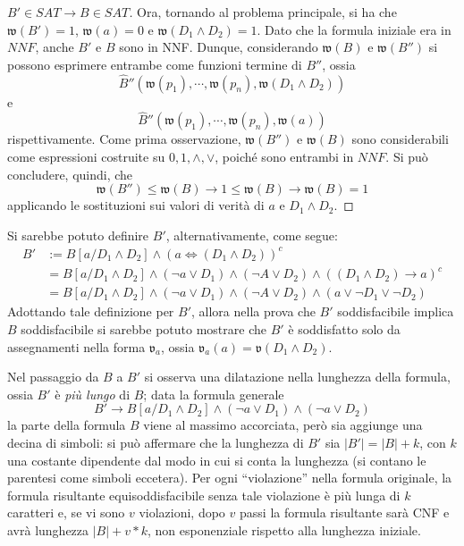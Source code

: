 \begin{proof}[$B' \in SAT \rightarrow B \in SAT$]
        Ora, tornando al problema principale, si ha che  $\mathfrak{w}(B') = 1$, 
        $\mathfrak{w}(a) = 0$ e $\mathfrak{w}(D_1 \land D_2) = 1$. Dato 
        che la formula iniziale era in $NNF$, anche $B'$ e $B$ sono in 
        NNF. Dunque, considerando $\mathfrak{w}(B)$ e $\mathfrak{w}(B'')$ 
        si possono esprimere entrambe come funzioni termine 
        di $B''$, ossia  
        $$
        \hat{B}''(\mathfrak{w}(p_1), \cdots, \mathfrak{w}(p_n), \mathfrak{w}(D_1 \land D_2))
        $$
        e
        $$
        \hat{B}''(\mathfrak{w}(p_1), \cdots, \mathfrak{w}(p_n), \mathfrak{w}(a))
        $$
        rispettivamente. Come prima osservazione, $\mathfrak{w}(B'')$ e $\mathfrak{w}(B)$
        sono considerabili come espressioni costruite su $0,1,\land,\lor$, poiché 
        sono entrambi in $NNF$. Si può concludere, quindi, che 
        $$
        \mathfrak{w}(B'') \leq \mathfrak{w}(B) \rightarrow 1 \leq \mathfrak{w}(B) \rightarrow \mathfrak{w}(B) = 1
        $$
        applicando le sostituzioni sui valori di verità di $a$ e $D_1 \land D_2$. 
\end{proof}

\begin{oss}
        Si sarebbe potuto definire $B'$, alternativamente, come segue: 
        \begin{align*}
                B' &:= B[a/D_1 \land D_2] \land (a \iff (D_1 \land D_2))^c \\
                   &=  B[a/D_1 \land D_2] \land (\neg a \lor D_1) \land (\neg A \lor D_2) \land ((D_1 \land D_2) \rightarrow a)^c \\
                   &=  B[a/D_1 \land D_2] \land (\neg a \lor D_1) \land (\neg A \lor D_2) \land (a \lor \neg D_1 \lor \neg D_2)
        \end{align*}
        Adottando tale definizione per $B'$, allora nella prova che $B'$ soddisfacibile 
        implica $B$ soddisfacibile si sarebbe potuto mostrare che $B'$ è 
        soddisfatto solo da assegnamenti nella forma $\mathfrak{v}_a$, 
        ossia $\mathfrak{v}_a(a) = \mathfrak{v}(D_1\land D_2)$.
\end{oss}

Nel passaggio da $B$ a $B'$ si osserva una dilatazione nella lunghezza della 
formula, ossia $B'$ è \textit{più lungo} di $B$; data la formula 
generale 
$$
B' \rightarrow B[a/D_1 \land D_2] \land (\neg a \lor D_1) \land (\neg a \lor D_2)
$$
la parte della formula $B$ viene al massimo accorciata, però sia aggiunge una 
decina di simboli: si può affermare che la lunghezza di 
$B'$ sia $|B'| = |B| + k$, con $k$ una costante dipendente dal 
modo in cui si conta la lunghezza (si contano le parentesi come simboli eccetera). 
Per ogni ``violazione'' nella formula originale, la formula risultante equisoddisfacibile
senza tale violazione è più lunga di $k$ caratteri e, se vi sono $v$ violazioni, 
dopo $v$ passi la formula risultante sarà CNF e avrà lunghezza $|B| + v * k$, 
non esponenziale rispetto alla lunghezza iniziale. 

